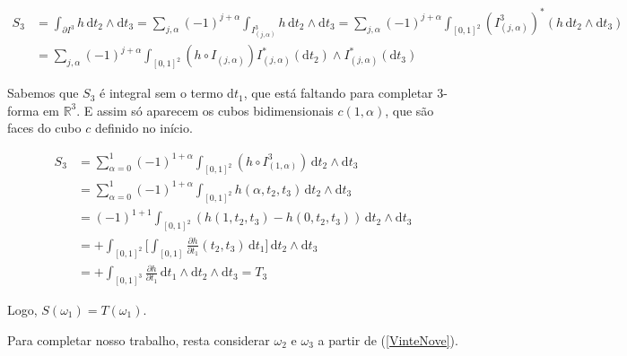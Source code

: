 \documentclass[12pt,a4paper]{article}
\begin{document}
		\begin{align}
			S_3 &= \int_{\partial I^3} h \,\mathrm{d}t_2 \wedge \mathrm{d}t_3 = \sum_{j, \alpha} (-1)^{j + \alpha} \int_{I^3_{(j, \alpha)}} h \,\mathrm{d}t_2 \wedge \mathrm{d}t_3 = \sum_{j, \alpha} (-1)^{j + \alpha} \int_{[0,1]^2} (I_{(j, \alpha)}^{3})^* (h \,\mathrm{d}t_2 \wedge \mathrm{d}t_3) \\
			&= \sum_{j, \alpha} (-1)^{j + \alpha} \int_{[0,1]^2} (h \circ I_{(j, \alpha)}) I^*_{(j, \alpha)} (\mathrm{d}t_2) \wedge I^*_{(j, \alpha)} (\mathrm{d}t_3)
		\end{align}

		Sabemos que $S_3$ \'e integral sem o termo d$t_1$, que est\'a faltando para completar 3-forma em $\mathbb{R}^3$. E assim s\'o aparecem os cubos bidimensionais $c(1, \alpha)$, que s\~ao faces do cubo $c$ definido no in\'icio.

		\begin{align}
			S_3 &= \sum_{\alpha = 0}^1 (-1)^{1 + \alpha} \int_{[0,1]^2} (h \circ I^3_{(1, \alpha)}) \,\mathrm{d}t_2 \wedge \mathrm{d}t_3 \\
			&= \sum_{\alpha = 0}^1 (-1)^{1 + \alpha} \int_{[0,1]^2} h(\alpha, t_2, t_3) \,\mathrm{d}t_2 \wedge \mathrm{d}t_3 \\
			&= (-1)^{1 + 1} \int_{[0,1]^2} (h(1, t_2, t_3) - h(0, t_2, t_3)) \,\mathrm{d}t_2 \wedge \mathrm{d}t_3 \\
			&= + \int_{[0,1]^2} \biggl[ \int_{[0,1]} \frac{\partial h}{\partial t_1} (t_2, t_3) \,\mathrm{d}t_1 \biggl] \,\mathrm{d}t_2 \wedge \mathrm{d}t_3 \\
			&= + \int_{[0,1]^3} \frac{\partial h}{\partial t_1} \,\mathrm{d}t_1 \wedge \mathrm{d}t_2 \wedge \mathrm{d}t_3 = T_3
		\end{align}

		Logo, $S(\omega_1) = T(\omega_1)$.

		Para completar nosso trabalho, resta considerar $\omega_2$ e $\omega_3$ a partir de (\ref{VinteNove}).
\end{document}
